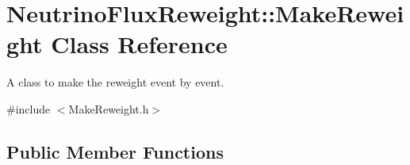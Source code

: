 \hypertarget{class_neutrino_flux_reweight_1_1_make_reweight}{\section{Neutrino\-Flux\-Reweight\-:\-:Make\-Reweight Class Reference}
\label{class_neutrino_flux_reweight_1_1_make_reweight}
}


A class to make the reweight event by event.  




{\ttfamily \#include $<$Make\-Reweight.\-h$>$}

\subsection*{Public Member Functions}
